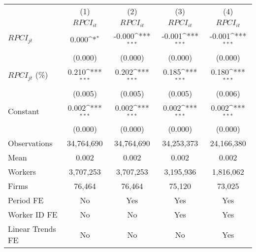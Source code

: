 {
\def\sym#1{\ifmmode^{#1}\else\(^{#1}\)\fi}
\begin{tabular}{l*{4}{c}}
\hline\hline
                    &\multicolumn{1}{c}{(1)}&\multicolumn{1}{c}{(2)}&\multicolumn{1}{c}{(3)}&\multicolumn{1}{c}{(4)}\\
                    &\multicolumn{1}{c}{$RPCI_{it}$}&\multicolumn{1}{c}{$RPCI_{it}$}&\multicolumn{1}{c}{$RPCI_{it}$}&\multicolumn{1}{c}{$RPCI_{it}$}\\
\hline
$RPCI_{jt}$         &       0.000\sym{*}  &      -0.000\sym{***}&      -0.001\sym{***}&      -0.001\sym{***}\\
                    &     (0.000)         &     (0.000)         &     (0.000)         &     (0.000)         \\
[1em]
$RPCI_{jt}$ (\%)    &       0.210\sym{***}&       0.202\sym{***}&       0.185\sym{***}&       0.180\sym{***}\\
                    &     (0.005)         &     (0.005)         &     (0.005)         &     (0.006)         \\
[1em]
Constant            &       0.002\sym{***}&       0.002\sym{***}&       0.002\sym{***}&       0.002\sym{***}\\
                    &     (0.000)         &     (0.000)         &     (0.000)         &     (0.000)         \\
\hline
Observations        &  34,764,690         &  34,764,690         &  34,253,373         &  24,166,380         \\
Mean                &       0.002         &       0.002         &       0.002         &       0.002         \\
Workers             &   3,707,253         &   3,707,253         &   3,195,936         &   1,816,062         \\
Firms               &      76,464         &      76,464         &      75,120         &      73,025         \\
Period FE           &          No         &         Yes         &         Yes         &         Yes         \\
Worker ID FE        &          No         &          No         &         Yes         &         Yes         \\
Linear Trends FE    &          No         &          No         &          No         &         Yes         \\
\hline\hline
\end{tabular}
}
